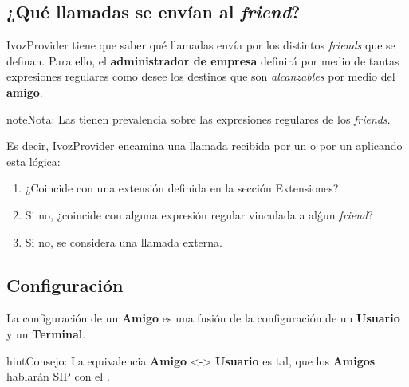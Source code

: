 \documentclass[letterpaper,10pt,spanish]{sphinxmanual}
\begin{document}
\subsection{¿Qué llamadas se envían al \emph{friend}?}
\label{pbx_features/friends:what-kind-of-calls-can-be-routed-through-a-friend}
IvozProvider tiene que saber qué llamadas envía por los distintos \emph{friends} que se definan. Para ello, el \textbf{administrador de empresa} definirá por medio de tantas expresiones regulares como desee los destinos que son \emph{alcanzables} por medio del \textbf{amigo}.

\begin{notice}{note}{Nota:}
Las {\hyperref[pbx_features/extensions:extensions]{}} tienen prevalencia sobre las expresiones regulares de los \emph{friends}.
\end{notice}

Es decir, IvozProvider encamina una llamada recibida por un {\hyperref[pbx_features/users:users]{}} o por un {\hyperref[pbx_features/friends:friends]{}} aplicando esta lógica:
\begin{enumerate}
\item {} 
¿Coincide con una extensión definida en la sección Extensiones?

\item {} 
Si no, ¿coincide con alguna expresión regular vinculada a alǵun \emph{friend}?

\item {} 
Si no, se considera una llamada externa.

\end{enumerate}


\subsection{Configuración}
\label{pbx_features/friends:configuration}
La configuración de un \textbf{Amigo} es una fusión de la configuración de un \textbf{Usuario} y un \textbf{Terminal}.

\begin{notice}{hint}{Consejo:}
La equivalencia \textbf{Amigo} \textless{}-\textgreater{} \textbf{Usuario} es tal, que los \textbf{Amigos} hablarán SIP con el {\hyperref[internal_calls/god_portal:proxyusers]{}}.
\end{notice}
\end{document}

